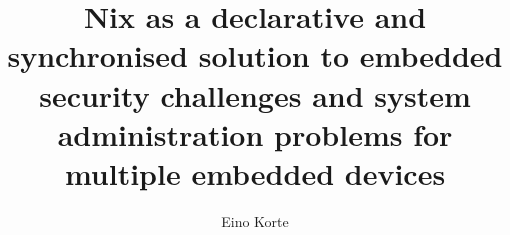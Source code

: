 \documentclass[language=english,version=final,mainfont=none,sharelatex=false]{utuftthesis}
\providecommand{\algorithmname}{Algoritmi}
\begin{document}
\title{Nix as a declarative and synchronised solution to embedded security challenges and system administration problems for multiple embedded devices}
\author{Eino Korte}

\maketitle


\tableofcontents

\listoffigures

\listoftables

\listofacronyms

\renewcommand{\algorithmname}{\listingscaption}

\begin{comment}
To better organize things, create a new tex file for each chapter
and input it below.

Avoid using the å, ä, ö or <space> characters in referred names and
underscores \_ in file names (may break hyperref).

Good luck!
\end{comment}









\printbibliography
\begin{comment}
Important! Create the appendix chapters with command \textbackslash appchapter\{some
name\} instead of \textbackslash chapter\{some name\} for the automagic
page counting to work!
\end{comment}
\end{document}
